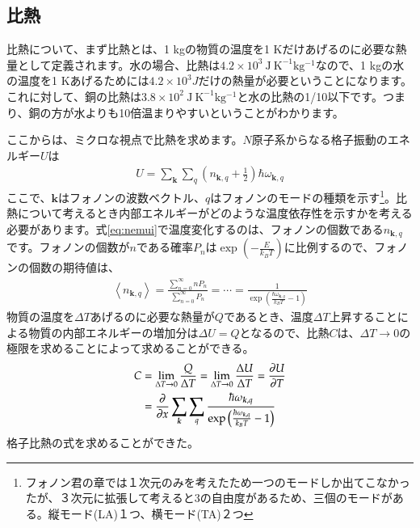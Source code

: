 \documentclass[10pt,b5paper,papersize,dvipdfmx]{jsbook}
\begin{document}
\subsection{比熱}
比熱について、まず比熱とは、1 kgの物質の温度を1 Kだけあげるのに必要な熱量として定義されます。水の場合、比熱は$4.2 \times 10^3\  \mathrm{J\ K ^{-1} kg^{-1}}$なので、1 kgの水の温度を1 Kあげるためには$4.2 \times 10^3 J$だけの熱量が必要ということになります。これに対して、銅の比熱は$3.8 \times 10^2\ \mathrm{J\ K ^{-1} kg^{-1}}$と水の比熱の1/10以下です。つまり、銅の方が水よりも10倍温まりやすいということがわかります。\par
ここからは、ミクロな視点で比熱を求めます。$N$原子系からなる格子振動のエネルギー$U$は
\begin{align}
  U = \sum_{\bm{k}}\sum_{q}\left(n_{\bm{k},q} + \frac{1}{2}\right)\hbar \omega_{\bm{k},q}
  \label{eq:nemui}
\end{align}
ここで、$\bm{k}$はフォノンの波数ベクトル、$q$はフォノンのモードの種類を示す\footnote{フォノン君の章では１次元のみを考えたため一つのモードしか出てこなかったが、３次元に拡張して考えると3の自由度があるため、三個のモードがある。縦モード(LA)１つ、横モード(TA)２つ}。比熱について考えるとき内部エネルギーがどのような温度依存性を示すかを考える必要があります。式\ref{eq:nemui}で温度変化するのは、フォノンの個数である$n_{\bm{k},q}$です。フォノンの個数が$n$である確率$P_n$は$\exp\left(-\frac{E}{k_BT}\right)$に比例するので、フォノンの個数の期待値は、
\begin{align}
  \left\langle n_{\bm{k},q}\right\rangle = \frac{\sum_{n = 0}^\infty nP_n}{\sum_{n = 0}^\infty P_n} = \cdots = \frac{1}{\exp \left(\frac{\hbar \omega_{\bm{k}, q}}{k_BT}-1\right)}
\end{align}
物質の温度を$\Delta T$あげるのに必要な熱量が$Q$であるとき、温度$\Delta T$上昇することによる物質の内部エネルギーの増加分は$\Delta U = Q$となるので、比熱$C$は、$\Delta T \rightarrow 0$の極限を求めることによって求めることができる。
\begin{align}
  C &= \lim_{\Delta T \rightarrow 0} \frac{Q}{\Delta T} = \lim_{\Delta T \rightarrow 0} \frac{\Delta U}{\Delta T} = \pdv{U}{T}\\
    &= \pdv{x} \sum_{\bm{k}}\sum_{q}\frac{\hbar \omega_{\bm{k},q}}{\exp\left(\frac{\hbar \omega_{\bm{k},q}}{k_BT}-1\right)}
\label{eq:totemonemutai}
\end{align}
格子比熱の式を求めることができた。
\end{document}
